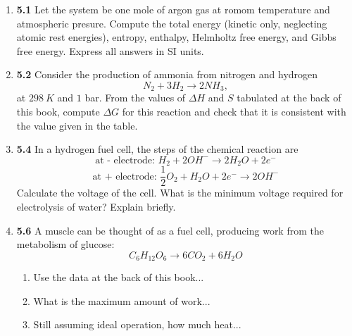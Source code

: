 \documentclass[fleqn]{article}
\begin{document}
  \begin{enumerate}
    \item \textbf{5.1} Let the system be one mole of argon gas at romom temperature and atmospheric presure. Compute
    the total energy (kinetic only, neglecting atomic rest energies), entropy, enthalpy, Helmholtz free energy, and 
    Gibbs free energy. Express all answers in SI units.


    \item \textbf{5.2} Consider the production of ammonia from nitrogen and hydrogen
    $$
      N_2+3H_2 \longrightarrow 2NH_3,
    $$
    at $298 ~ K$ and $1$ bar. From the values of $\Delta H$ and $S$ tabulated at the back of this book, compute $\Delta G$
    for this reaction and check that it is consistent with the value given in the table.


    \item \textbf{5.4} In a hydrogen fuel cell, the steps of the chemical reaction are
    $$
      \text{at - electrode: } H_2+2OH^- \longrightarrow 2H_2O+2e^-
    $$
    $$
      \text{at + electrode: } \dfrac{1}{2} O_2+H_2 O+2e^- \longrightarrow 2OH^-
    $$
    Calculate the voltage of the cell. What is the minimum voltage required for electrolysis of water? Explain briefly.


    \item \textbf{5.6} A muscle can be thought of as a fuel cell, producing work from the metabolism of glucose:
    $$
      C_6 H_{12} O_6 \longrightarrow 6 CO_2+6H_2 O
    $$
    \begin{enumerate}
      \item Use the data at the back of this book...


      \item What is the maximum amount of work...


      \item Still assuming ideal operation, how much heat...


\end{enumerate}
\end{enumerate}
\end{document}
